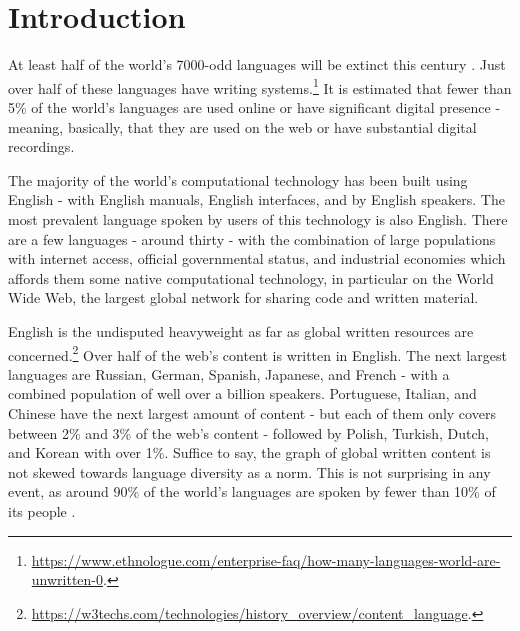 \section{Introduction}
\label{sec:intro}

At least half of the world's 7000-odd languages will be extinct this century \citep{krauss92, grenoble2011cambridge}. Just over half of these languages have writing systems.\footnote{\href{https://www.ethnologue.com/enterprise-faq/how-many-languages-world-are-unwritten-0}{https://www.ethnologue.com/enterprise-faq/how-many-languages-world-are-unwritten-0}. } It is estimated that fewer than 5\% of the world's languages are used online or have significant digital presence \citep{kornai2013digital} - meaning, basically, that they are used on the web or have substantial digital recordings.

The majority of the world's computational technology has been built using English - with English manuals, English interfaces, and by English speakers. The most prevalent language spoken by users of this technology is also English. There are a few languages - around thirty - with the combination of large populations with internet access, official governmental status, and industrial economies which affords them some native computational technology, in particular on the World Wide Web, the largest global network for sharing code and written material.

English is the undisputed heavyweight as far as global written resources are concerned.\footnote{\href{https://w3techs.com/technologies/history_overview/content_language}{https://w3techs.com/technologies/history\_overview/content\_language}. } Over half of the web's content is written in English. The next largest languages are Russian, German, Spanish, Japanese, and French - with a combined population of well over a billion speakers. Portuguese, Italian, and Chinese have the next largest amount of content - but each of them only covers between 2\% and 3\% of the web's content - followed by Polish, Turkish, Dutch, and Korean with over 1\%. Suffice to say, the graph of global written content is not skewed towards language diversity as a norm. This is not surprising in any event, as around 90\% of the world's languages are spoken by fewer than 10\% of its people \citep{bernard1992preserving}.

